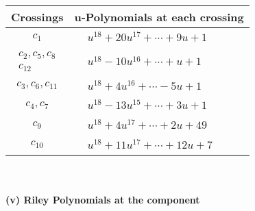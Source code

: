 \documentclass[1p]{elsarticle_modified}
\theoremstyle{definition}
\begin{document}
\begin{tabular}{m{50pt}|m{274pt}}
Crossings & \hspace{64pt}u-Polynomials at each crossing \\
\hline $$\begin{aligned}c_{1}\end{aligned}$$&$\begin{aligned}
&u^{18}+20 u^{17}+\cdots+9 u+1
\end{aligned}$\\
\hline $$\begin{aligned}c_{2},c_{5},c_{8}\\c_{12}\end{aligned}$$&$\begin{aligned}
&u^{18}-10 u^{16}+\cdots+u+1
\end{aligned}$\\
\hline $$\begin{aligned}c_{3},c_{6},c_{11}\end{aligned}$$&$\begin{aligned}
&u^{18}+4 u^{16}+\cdots-5 u+1
\end{aligned}$\\
\hline $$\begin{aligned}c_{4},c_{7}\end{aligned}$$&$\begin{aligned}
&u^{18}-13 u^{15}+\cdots+3 u+1
\end{aligned}$\\
\hline $$\begin{aligned}c_{9}\end{aligned}$$&$\begin{aligned}
&u^{18}+4 u^{17}+\cdots+2 u+49
\end{aligned}$\\
\hline $$\begin{aligned}c_{10}\end{aligned}$$&$\begin{aligned}
&u^{18}+11 u^{17}+\cdots+12 u+7
\end{aligned}$\\
\hline
\end{tabular}\\~\\
\newpage\renewcommand{\arraystretch}{1}
\flushleft \textbf{(v) Riley Polynomials at the component}\newline \\
\end{document}
